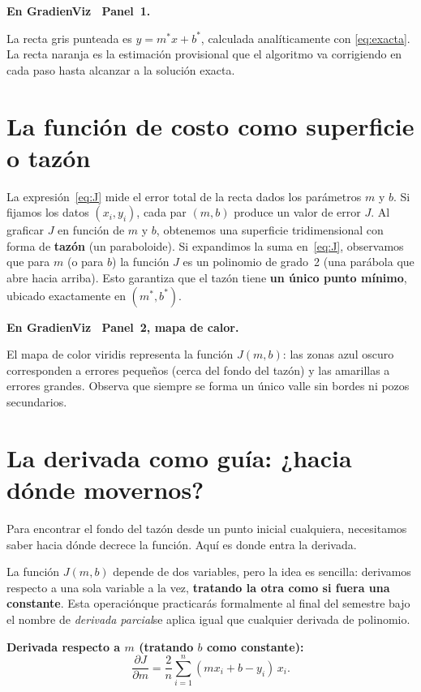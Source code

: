 \documentclass[12pt, a4paper]{article}
\newenvironment{viznota}[1]{%
    \begin{mdframed}[style=vizverde]
    \textbf{\color{bordeteo}En GradienViz \textemdash\ #1.}\quad
}{%
    \end{mdframed}
}
\newcommand{\mstar}{m^{*}}
\newcommand{\bstar}{b^{*}}
\newcommand{\Jfun}{J(m,b)}
\begin{document}
\begin{viznota}{Panel~1}
La recta gris punteada es $y = \mstar x + \bstar$, calculada analíticamente con \eqref{eq:exacta}. La recta naranja es la estimación provisional que el algoritmo va corrigiendo en cada paso hasta alcanzar a la solución exacta.
\end{viznota}

\section{La función de costo como superficie o tazón}

La expresión~\eqref{eq:J} mide el error total de la recta dados los parámetros $m$ y $b$. Si fijamos los datos $(x_i, y_i)$, cada par $(m, b)$ produce un valor de error $J$. Al graficar $J$ en función de $m$ y $b$, obtenemos una superficie tridimensional con forma de \textbf{tazón} (un paraboloide). Si expandimos la suma en~\eqref{eq:J}, observamos que para $m$ (o para $b$) la función $J$ es un polinomio de grado~2 (una parábola que abre hacia arriba). Esto garantiza que el tazón tiene \textbf{un único punto mínimo}, ubicado exactamente en $(\mstar, \bstar)$.

\begin{viznota}{Panel~2, mapa de calor}
El mapa de color viridis representa la función $\Jfun$: las zonas azul oscuro corresponden a errores pequeños (cerca del fondo del tazón) y las amarillas a errores grandes. Observa que siempre se forma un único valle sin bordes ni pozos secundarios.
\end{viznota}

\section{La derivada como guía: ¿hacia dónde movernos?}

Para encontrar el fondo del tazón desde un punto inicial cualquiera, necesitamos saber hacia dónde decrece la función. Aquí es donde entra la derivada.

La función $J(m, b)$ depende de dos variables, pero la idea es sencilla: derivamos respecto a una sola variable a la vez, \textbf{tratando la otra como si fuera una constante}. Esta operación\textemdash que practicarás formalmente al final del semestre bajo el nombre de \emph{derivada parcial}\textemdash se aplica igual que cualquier derivada de polinomio.

\medskip
\textbf{Derivada respecto a $m$ (tratando $b$ como constante):}
\begin{equation}\label{eq:gm}
    \frac{\partial J}{\partial m} = \frac{2}{n}\sum_{i=1}^{n}(m x_i + b - y_i)\,x_i.
\end{equation}
\end{document}
